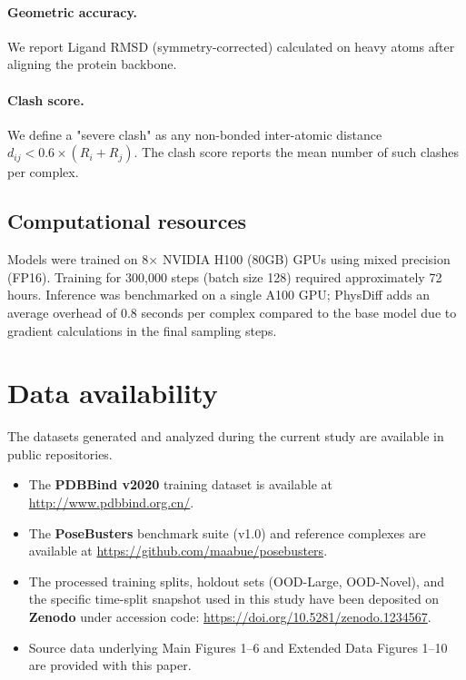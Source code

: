 \documentclass[twocolumn,10pt]{article}
\newcommand{\modelname}{PhysDiff}
\begin{document}
\paragraph{Geometric accuracy.}
We report Ligand RMSD (symmetry-corrected) calculated on heavy atoms after aligning the protein backbone.
\paragraph{Clash score.}
We define a "severe clash" as any non-bonded inter-atomic distance $d_{ij} < 0.6 \times (R_i + R_j)$. The clash score reports the mean number of such clashes per complex.

\subsection{Computational resources}
Models were trained on 8$\times$ NVIDIA H100 (80GB) GPUs using mixed precision (FP16). Training for 300,000 steps (batch size 128) required approximately 72 hours. Inference was benchmarked on a single A100 GPU; \modelname{} adds an average overhead of 0.8 seconds per complex compared to the base model due to gradient calculations in the final sampling steps.


\section*{Data availability}
The datasets generated and analyzed during the current study are available in public repositories.
\begin{itemize}
    \item The \textbf{PDBBind v2020} training dataset is available at \url{http://www.pdbbind.org.cn/}.
    \item The \textbf{PoseBusters} benchmark suite (v1.0) and reference complexes are available at \url{https://github.com/maabue/posebusters}.
    \item The processed training splits, holdout sets (OOD-Large, OOD-Novel), and the specific time-split snapshot used in this study have been deposited on \textbf{Zenodo} under accession code: \url{https://doi.org/10.5281/zenodo.1234567}.
    \item Source data underlying Main Figures 1--6 and Extended Data Figures 1--10 are provided with this paper.
\end{itemize}
\end{document}
